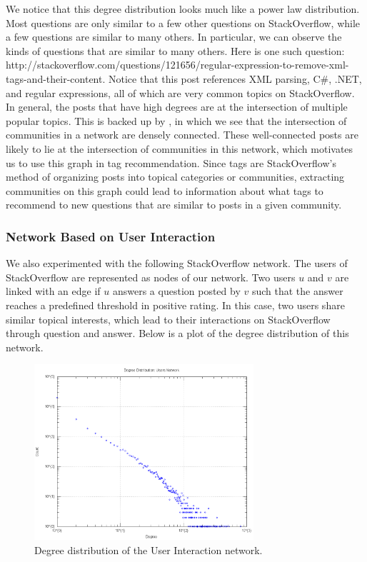 \documentclass[11pt]{IEEEtran}
\begin{document}
We notice that this degree distribution looks much like a power law distribution. Most questions are only similar to a few other questions on StackOverflow, while a few questions are similar to many others. In particular, we can observe the kinds of questions that are similar to many others. Here is one such question: http://stackoverflow.com/questions/121656/regular-expression-to-remove-xml-tags-and-their-content.
Notice that this post references XML parsing, C\#, .NET, and regular expressions, all of which are very common topics on StackOverflow. In general, the posts that have high degrees are at the intersection of multiple popular topics. This is backed up by \cite{8}, in which we see that the intersection of communities in a network are densely connected. These well-connected posts are likely to lie at the intersection of communities in this network, which motivates us to use this graph in tag recommendation. Since tags are StackOverflow’s method of organizing posts into topical categories or communities, extracting communities on this graph could lead to information about what tags to recommend to new questions that are similar to posts in a given community.

\subsubsection{Network Based on User Interaction}

We also experimented with the following StackOverflow network. The users of StackOverflow are represented as nodes of our network. Two users $u$ and $v$ are linked with an edge if $u$ answers a question posted by $v$ such that the answer reaches a predefined threshold in positive rating. In this case, two users share similar topical interests, which lead to their interactions on StackOverflow through question and answer. Below is a plot of the degree distribution of this network.

\begin{figure}[h]
  \centering
    \includegraphics[width=3.2in]{user_degdistr.png}
  \caption{Degree distribution of the User Interaction network.}
  \label{fig:user_dd}
\end{figure}
\end{document}
